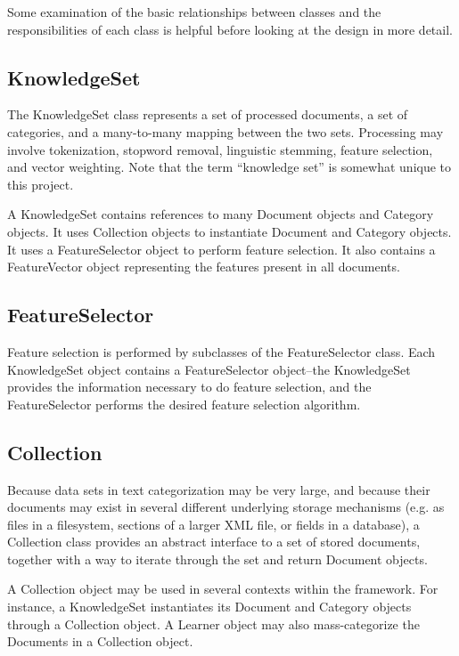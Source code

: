 \documentclass[a4paper]{report}
\begin{document}
Some examination of the basic relationships between classes and the
responsibilities of each class is helpful before looking at the design
in more detail.

\subsection{KnowledgeSet}

The KnowledgeSet class represents a set of processed documents, a set
of categories, and a many-to-many mapping between the two sets.
Processing may involve tokenization, stopword removal, linguistic
stemming, feature selection, and vector weighting.  Note that the term
``knowledge set'' is somewhat unique to this project.

A KnowledgeSet contains references to many Document objects and
Category objects.  It uses Collection objects to instantiate Document
and Category objects.  It uses a FeatureSelector object to perform
feature selection.  It also contains a FeatureVector object
representing the features present in all documents.

\subsection{FeatureSelector}

Feature selection is performed by subclasses of the FeatureSelector
class.  Each KnowledgeSet object contains a FeatureSelector
object--the KnowledgeSet provides the information necessary to do
feature selection, and the FeatureSelector performs the desired
feature selection algorithm.

\subsection{Collection}

Because data sets in text categorization may be very large, and
because their documents may exist in several different underlying
storage mechanisms (e.g. as files in a filesystem, sections of a
larger XML file, or fields in a database), a Collection class provides
an abstract interface to a set of stored documents, together with a
way to iterate through the set and return Document objects.

A Collection object may be used in several contexts within the
framework.  For instance, a KnowledgeSet instantiates its Document and
Category objects through a Collection object.  A Learner object may
also mass-categorize the Documents in a Collection object.
\end{document}
